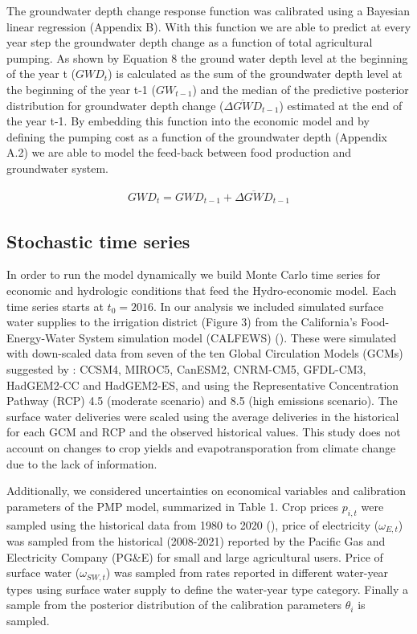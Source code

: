 \documentclass[11pt,a4paper]{article}
\begin{document}
The groundwater depth change response function was calibrated using a Bayesian linear regression (Appendix B). With this function we are able to predict at every year step the groundwater depth change as a function of total agricultural pumping. As shown by Equation 8 the ground water depth level at the beginning of the year t ($GWD_{t}$) is calculated as the sum of the groundwater depth level at the beginning of the year t-1 ($GW_{t-1}$) and the median of the predictive posterior distribution for groundwater depth change ($\overline{\Delta GWD}_{t-1}$) estimated at the end of the year t-1. By embedding this function into the economic model and by defining the pumping cost as a function of the groundwater depth (Appendix A.2) we are able to model the feed-back between food production and groundwater system.

\begin{align}
GWD_{t} = GWD_{t-1} + \overline{\Delta GWD}_{t-1}
\end{align}

\subsection{Stochastic time series}

In order to run the model dynamically we build Monte Carlo time series for economic and hydrologic conditions that feed the Hydro-economic model. Each time series starts at $t_{0}=2016$. In our analysis we included simulated surface water supplies to the irrigation district (Figure 3) from the California’s Food-Energy-Water System simulation model (CALFEWS) (\cite{zeff_californias_2021}). These were simulated with down-scaled data from seven of the ten Global Circulation Models (GCMs) suggested by \textcite{pierce_climate_2018}: CCSM4, MIROC5, CanESM2, CNRM-CM5, GFDL-CM3, HadGEM2-CC and HadGEM2-ES, and using the Representative Concentration Pathway (RCP) 4.5 (moderate scenario) and 8.5 (high emissions scenario). The surface water deliveries were scaled using the average deliveries in the historical for each GCM and RCP and the observed historical values. This study does not account on changes to crop yields and evapotransporation from climate change due to the lack of information. 

Additionally, we considered uncertainties on economical variables and calibration parameters of the PMP model, summarized in Table 1. Crop prices $p_{i,t}$ were sampled using the historical data from 1980 to 2020 (\cite{usda_national_2020}), price of electricity ($\omega_{E,t}$) was sampled from the historical (2008-2021) reported by the Pacific Gas and Electricity Company (PG\&E) for small and large agricultural users. Price of surface water ($\omega_{SW,t}$) was sampled from rates reported in different water-year types using surface water supply to define the water-year type category. Finally a sample from the posterior distribution of the calibration parameters $\theta_{i}$ is sampled.
\end{document}
